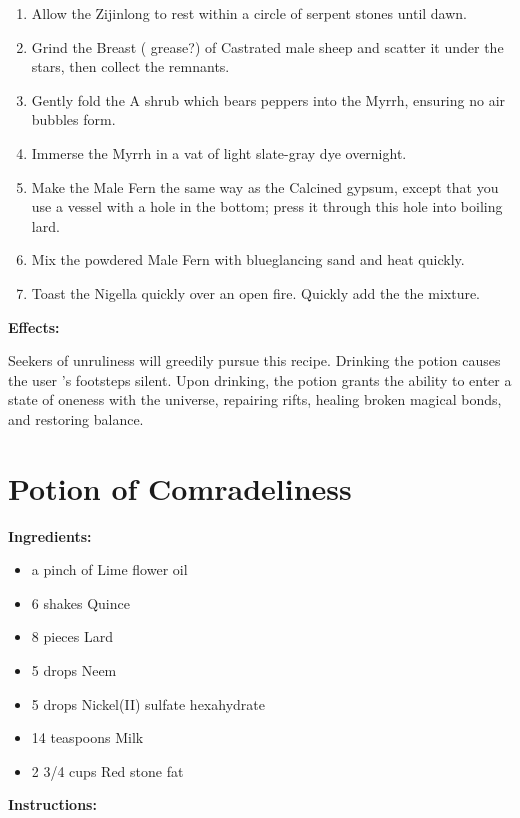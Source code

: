 \documentclass{article}
\begin{document}
\begin{enumerate}
  \item Allow the Zijinlong to rest within a circle of serpent stones until dawn.
  \item Grind the Breast ( grease?) of Castrated male sheep and scatter it under the stars, then collect the remnants.
  \item Gently fold the A shrub which bears peppers into the Myrrh, ensuring no air bubbles form.
  \item Immerse the Myrrh in a vat of light slate-gray dye overnight.
  \item Make the Male Fern the same way as the Calcined gypsum, except that you use a vessel with a hole in the bottom; press it through this hole into boiling lard.
  \item Mix the powdered Male Fern with blueglancing sand and heat quickly.
  \item Toast the Nigella quickly over an open fire. Quickly add the the mixture.
\end{enumerate}

\textbf{Effects:}

Seekers of unruliness will greedily pursue this recipe. Drinking the potion causes the user 's footsteps silent. Upon drinking, the potion grants the ability to enter a state of oneness with the universe, repairing rifts, healing broken magical bonds, and restoring balance.

\newpage
\section*{Potion of Comradeliness}

\textbf{Ingredients:}

\begin{itemize}
  \item a pinch of Lime flower oil
  \item 6 shakes Quince
  \item 8 pieces Lard
  \item 5 drops Neem
  \item 5 drops Nickel(II) sulfate hexahydrate
  \item 14 teaspoons Milk
  \item 2 3/4 cups Red stone fat
\end{itemize}

\textbf{Instructions:}
\end{document}
